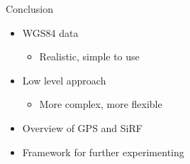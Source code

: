 \documentclass[utf8,12pt]{beamer}
\begin{document}
\begin{frame}{Conclusion}
    \begin{itemize}
        \item WGS84 data
        \begin{itemize}
            \item Realistic, simple to use
        \end{itemize}
        \item Low level approach
        \begin{itemize}
            \item More complex, more flexible
        \end{itemize}
        \item Overview of GPS and SiRF
        \item Framework for further experimenting
    \end{itemize}
\end{frame}

{
\begin{frame}[plain]
\end{frame}
}

%
\end{document}
